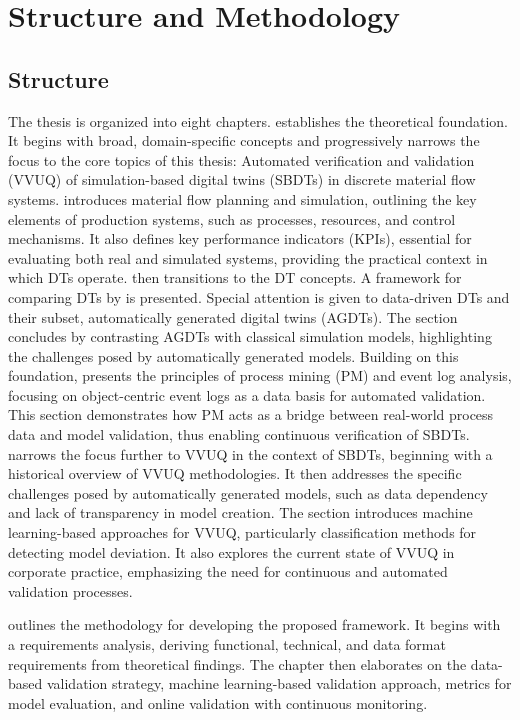 \section{Structure and Methodology}

\subsection*{Structure}
The thesis is organized into eight chapters.
 establishes the theoretical foundation. It begins with broad, domain-specific concepts and progressively narrows the focus to the core topics of this thesis: Automated verification and validation (VVUQ) of simulation-based digital twins (SBDTs) in discrete material flow systems.
 introduces material flow planning and simulation, outlining the key elements of production systems, such as processes, resources, and control mechanisms. It also defines key performance indicators (KPIs), essential for evaluating both real and simulated systems, providing the practical context in which DTs operate.
 then transitions to the DT concepts. A framework for comparing DTs by \textcite{schwede2024learning} is presented. Special attention is given to data-driven DTs and their subset, automatically generated digital twins (AGDTs). The section concludes by contrasting AGDTs with classical simulation models, highlighting the challenges posed by automatically generated models.
Building on this foundation,  presents the principles of process mining (PM) and event log analysis, focusing on object-centric event logs as a data basis for automated validation. This section demonstrates how PM acts as a bridge between real-world process data and model validation, thus enabling continuous verification of SBDTs.
 narrows the focus further to VVUQ in the context of SBDTs, beginning with a historical overview of VVUQ methodologies. It then addresses the specific challenges posed by automatically generated models, such as data dependency and lack of transparency in model creation. The section introduces machine learning-based approaches for VVUQ, particularly classification methods for detecting model deviation. It also explores the current state of VVUQ in corporate practice, emphasizing the need for continuous and automated validation processes.

 outlines the methodology for developing the proposed framework. It begins with a requirements analysis, deriving functional, technical, and data format requirements from theoretical findings. The chapter then elaborates on the data-based validation strategy, machine learning-based validation approach, metrics for model evaluation, and online validation with continuous monitoring.

